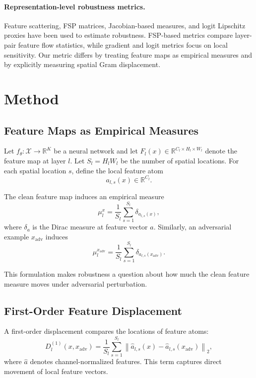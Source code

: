 \documentclass[10pt,twocolumn]{article}
\newcommand{\xadv}{x_{\mathrm{adv}}}
\newcommand{\R}{\mathbb{R}}
\begin{document}
\paragraph{Representation-level robustness metrics.}
Feature scattering, FSP matrices, Jacobian-based measures, and logit Lipschitz proxies have been used to estimate robustness.
FSP-based metrics compare layer-pair feature flow statistics, while gradient and logit metrics focus on local sensitivity.
Our metric differs by treating feature maps as empirical measures and by explicitly measuring spatial Gram displacement.

\section{Method}

\subsection{Feature Maps as Empirical Measures}

Let $f_{\theta}: \mathcal{X} \to \R^K$ be a neural network and let
$F_l(x) \in \R^{C_l \times H_l \times W_l}$ denote the feature map at layer $l$.
Let $S_l = H_l W_l$ be the number of spatial locations.
For each spatial location $s$, define the local feature atom
\begin{equation}
  a_{l,s}(x) \in \R^{C_l}.
\end{equation}

The clean feature map induces an empirical measure
\begin{equation}
  \mu_l^x = \frac{1}{S_l}\sum_{s=1}^{S_l} \delta_{a_{l,s}(x)},
\end{equation}
where $\delta_a$ is the Dirac measure at feature vector $a$.
Similarly, an adversarial example $\xadv$ induces
\begin{equation}
  \mu_l^{\xadv} = \frac{1}{S_l}\sum_{s=1}^{S_l} \delta_{a_{l,s}(\xadv)}.
\end{equation}

This formulation makes robustness a question about how much the clean feature measure moves under adversarial perturbation.

\subsection{First-Order Feature Displacement}

A first-order displacement compares the locations of feature atoms:
\begin{equation}
  D_l^{(1)}(x,\xadv)
  =
  \frac{1}{S_l}
  \sum_{s=1}^{S_l}
  \left\|
  \hat{a}_{l,s}(x) - \hat{a}_{l,s}(\xadv)
  \right\|_2,
\end{equation}
where $\hat{a}$ denotes channel-normalized features.
This term captures direct movement of local feature vectors.
\end{document}
